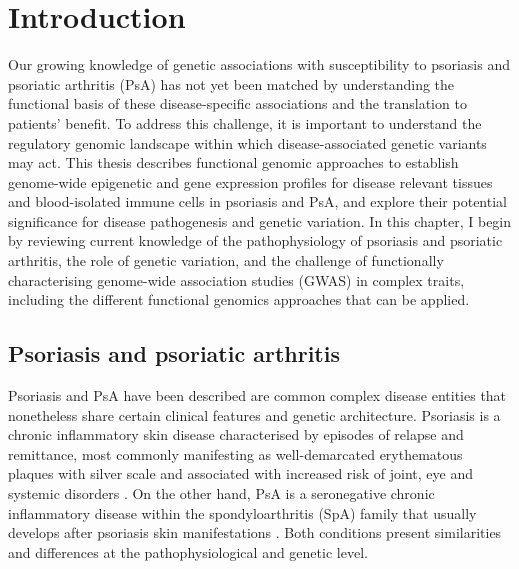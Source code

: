 \chapter{Introduction}
\label{ch:Intro}



Our growing knowledge of genetic associations with susceptibility to psoriasis and psoriatic arthritis (PsA) has not yet been matched by understanding the functional basis of these disease-specific associations and the translation to patients' benefit. To address this challenge, it is important to understand the regulatory genomic landscape within which disease-associated genetic variants may act. This thesis describes functional genomic approaches to establish genome-wide epigenetic and gene expression profiles for disease relevant tissues and blood-isolated immune cells in psoriasis and PsA, and explore their potential significance for disease pathogenesis and genetic variation. In this chapter, I begin by reviewing current knowledge of the pathophysiology of psoriasis and psoriatic arthritis, the role of genetic variation, and the challenge of functionally characterising genome-wide association studies (GWAS) in complex traits, including the different functional genomics approaches that can be applied.

\section{Psoriasis and psoriatic arthritis}
%
Psoriasis and PsA have been described are common complex disease entities that nonetheless share certain clinical features and genetic architecture. Psoriasis is a chronic inflammatory skin disease characterised by episodes of relapse and remittance, most commonly manifesting as well-demarcated erythematous plaques with silver scale and associated with increased risk of joint, eye and systemic disorders \parencite{Nestle2009}. On the other hand, PsA is a seronegative chronic inflammatory disease within the spondyloarthritis (SpA) family that usually develops after psoriasis skin manifestations \parencite{Moll1973, Coates2016, Villanova2013}. Both conditions present similarities and differences at the pathophysiological and genetic level.


